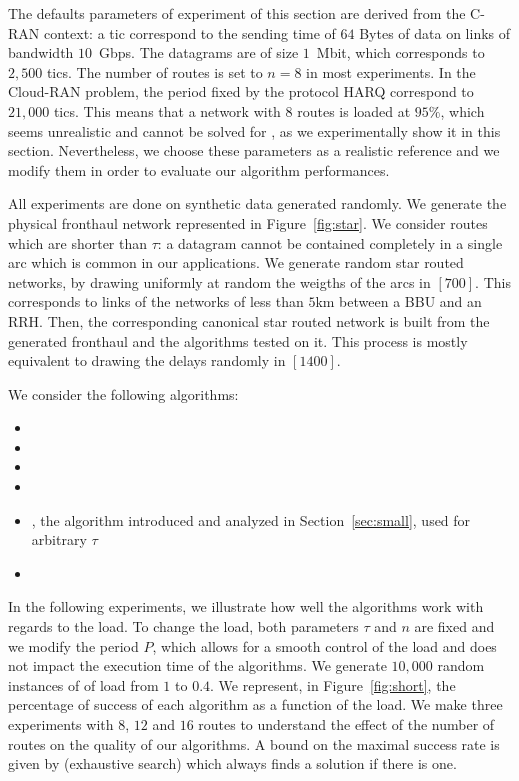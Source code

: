   The defaults parameters of experiment of this section are derived from the C-RAN context: a tic correspond to the sending time of $64$ Bytes of data on links of bandwidth $10$~Gbps. The datagrams are of size $1$~Mbit, which corresponds to $2,500$ tics. The number of routes is set to $n = 8$ in most experiments. In the Cloud-RAN problem, the period fixed by the protocol HARQ correspond to $21,000$ tics. This means that a network with $8$ routes is loaded at $95\%$, which seems unrealistic and cannot be solved for \pma, as we experimentally show it in this section. Nevertheless, we choose these parameters as a realistic reference and we modify them in order to evaluate our algorithm performances.


     All experiments are done on synthetic data generated randomly. We generate the physical fronthaul
     network represented in Figure~\ref{fig:star}. We consider routes which are shorter than $\tau$: a datagram cannot be contained completely in a single arc which is common in our applications. We generate random star routed networks, by drawing uniformly at random the weigths of the arcs in $[700]$. This corresponds to links of the networks of less than $5$km between a BBU and an RRH. Then, the corresponding canonical star routed network is built from the generated fronthaul and the algorithms tested on it. This process is mostly equivalent to drawing the delays randomly in $[1400]$.

     We consider the following algorithms:
\begin{itemize}
  \item \firstfit
  \item \metaoffset
  \item \compactpair
  \item \compactfit
  \item \greedyuniform, the algorithm introduced and analyzed in Section~\ref{sec:small}, used for arbitrary $\tau$
  \item \exactresolution 
\end{itemize}


     In the following experiments, we illustrate how well the algorithms work with regards to the load. To change the load, both parameters $\tau$ and $n$ are fixed and we modify the period $P$, which allows for a smooth control of the load and does not impact the execution time of the algorithms.
	   We generate $10,000$ random instances of \pma of load from $1$ to $0.4$. We represent, in Figure~\ref{fig:short}, the percentage of success of each algorithm as a function of the load. We make three experiments with $8$, $12$ and $16$ routes to understand the effect of the number of routes on the quality of our algorithms. A bound on the maximal success rate is given by \ESCA (exhaustive search) which always finds a solution if there is one. 

